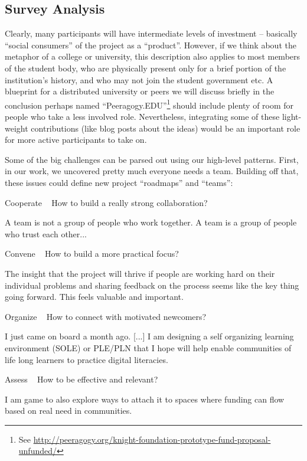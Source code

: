 \documentclass{acm_proc_article-sp}
\begin{document}
\subsection{Survey Analysis}

Clearly, many participants will have intermediate levels of investment -- basically ``social consumers'' of the project as a ``product''. However, if we think about the metaphor of a college or university, this description also applies to most members of the student body, who are physically present only for a brief portion of the institution's history, and who may not join the student government etc. A blueprint for a distributed university or peers we will discuss briefly in the conclusion perhaps named ``Peeragogy.EDU''\footnote{See \url{http://peeragogy.org/knight-foundation-prototype-fund-proposal-unfunded/}} should include plenty of room for people who take a less involved role. Nevertheless, integrating some of these light-weight contributions (like blog posts about the ideas) would be an important role for more active participants to take on.

Some of the big challenges can be parsed out using our high-level patterns. First, in our work, we uncovered pretty much everyone needs a team. Building off that, these issues could define new project ``roadmaps'' and ``teams'':

    Cooperate ~ How to build a really strong collaboration?

        A team is not a group of people who work together. A team is a group of people who trust each other...

    Convene ~ How to build a more practical focus?

        The insight that the project will thrive if people are working hard on their individual problems and sharing feedback on the process seems like the key thing going forward. This feels valuable and important.

    Organize ~ How to connect with motivated newcomers?

        I just came on board a month ago. [...] I am designing a self organizing learning environment (SOLE) or PLE/PLN that I hope will help enable communities of life long learners to practice digital literacies.

    Assess ~ How to be effective and relevant?

        I am game to also explore ways to attach it to spaces where funding can flow based on real need in communities.
\end{document}
